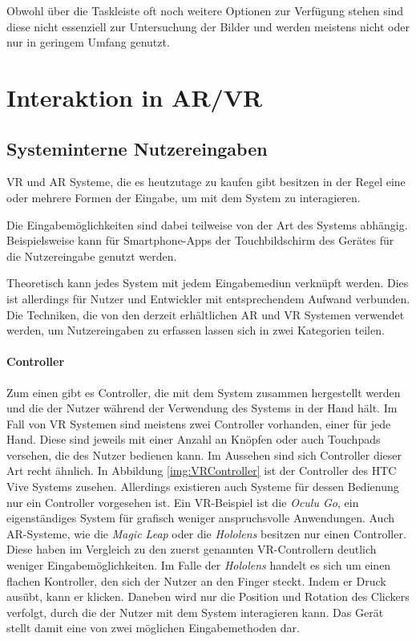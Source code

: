 Obwohl über die Taskleiste oft noch weitere Optionen zur Verfügung stehen sind diese nicht essenziell zur Untersuchung der Bilder und werden meistens nicht oder nur in geringem Umfang genutzt.

\section{Interaktion in AR/VR}	
\label{VRInteraktion}							 %
\subsection{Systeminterne Nutzereingaben}

VR und AR Systeme, die es heutzutage zu kaufen gibt besitzen in der Regel  eine oder mehrere Formen der Eingabe, um mit dem System zu interagieren.

Die Eingabemöglichkeiten sind dabei teilweise von der Art des Systems abhängig. 
Beispielsweise kann für Smartphone-Apps der Touchbildschirm des Gerätes für die Nutzereingabe genutzt werden. 

Theoretisch kann jedes System mit jedem Eingabemediun verknüpft werden. Dies ist allerdings für Nutzer und Entwickler mit entsprechendem Aufwand verbunden. Die Techniken, die von den derzeit erhältlichen AR und VR Systemen verwendet werden, um Nutzereingaben zu erfassen lassen sich in zwei Kategorien teilen. 
\paragraph{Controller}
Zum einen gibt es Controller, die mit dem System zusammen hergestellt werden und die der Nutzer während der Verwendung des Systems in der Hand hält. Im Fall von VR Systemen sind meistens zwei Controller vorhanden, einer für jede Hand. Diese sind jeweils mit einer Anzahl an Knöpfen oder auch Touchpads versehen, die des Nutzer bedienen kann. Im Aussehen sind sich Controller dieser Art recht ähnlich. In Abbildung \ref{img:VRController} ist der Controller des HTC Vive Systems zusehen.
Allerdings existieren auch Systeme für dessen Bedienung nur ein Controller vorgesehen ist. Ein VR-Beispiel ist die \textit{Oculu Go}, ein eigenständiges System für grafisch weniger anspruchsvolle Anwendungen. 
Auch AR-Systeme, wie die \textit{Magic Leap} oder die \textit{Hololens} besitzen nur einen Controller. Diese haben im Vergleich zu den zuerst genannten VR-Controllern deutlich weniger Eingabemöglichkeiten. Im Falle der \textit{Hololens} handelt es sich um einen flachen Kontroller, den sich der Nutzer an den Finger steckt. Indem er Druck ausübt, kann er klicken. Daneben wird nur die Position und Rotation des Clickers verfolgt, durch die der Nutzer mit dem System interagieren kann. Das Gerät stellt damit eine von zwei möglichen Eingabemethoden dar. 

